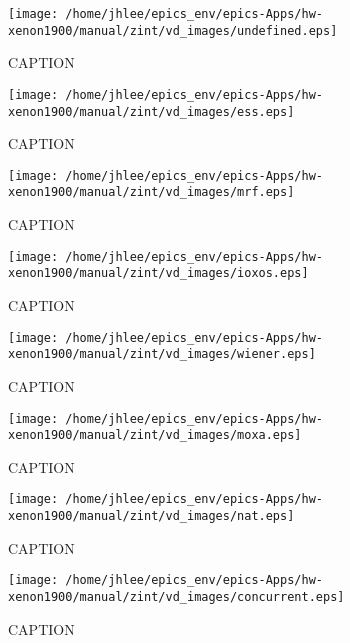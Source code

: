 \begin{figure}
  \centering
  \texttt{[image: /home/jhlee/epics\_env/epics-Apps/hw-xenon1900/manual/zint/vd\_images/undefined.eps]}
  \caption{CAPTION}
\end{figure}
\begin{figure}
  \centering
  \texttt{[image: /home/jhlee/epics\_env/epics-Apps/hw-xenon1900/manual/zint/vd\_images/ess.eps]}
  \caption{CAPTION}
\end{figure}
\begin{figure}
  \centering
  \texttt{[image: /home/jhlee/epics\_env/epics-Apps/hw-xenon1900/manual/zint/vd\_images/mrf.eps]}
  \caption{CAPTION}
\end{figure}
\begin{figure}
  \centering
  \texttt{[image: /home/jhlee/epics\_env/epics-Apps/hw-xenon1900/manual/zint/vd\_images/ioxos.eps]}
  \caption{CAPTION}
\end{figure}
\begin{figure}
  \centering
  \texttt{[image: /home/jhlee/epics\_env/epics-Apps/hw-xenon1900/manual/zint/vd\_images/wiener.eps]}
  \caption{CAPTION}
\end{figure}
\begin{figure}
  \centering
  \texttt{[image: /home/jhlee/epics\_env/epics-Apps/hw-xenon1900/manual/zint/vd\_images/moxa.eps]}
  \caption{CAPTION}
\end{figure}
\begin{figure}
  \centering
  \texttt{[image: /home/jhlee/epics\_env/epics-Apps/hw-xenon1900/manual/zint/vd\_images/nat.eps]}
  \caption{CAPTION}
\end{figure}
\begin{figure}
  \centering
  \texttt{[image: /home/jhlee/epics\_env/epics-Apps/hw-xenon1900/manual/zint/vd\_images/concurrent.eps]}
  \caption{CAPTION}
\end{figure}
